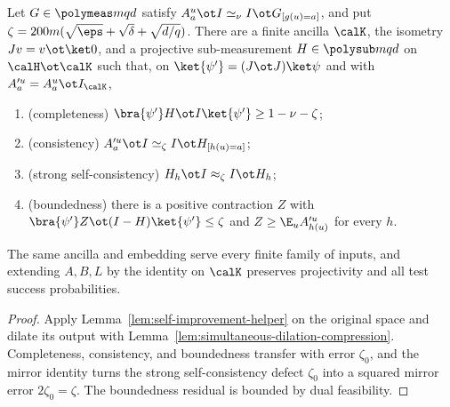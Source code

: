 \begin{theorem}\label{thm:self-improvement-in-induction-section}
	\leanok
	Let $G\in\polymeas mqd$ satisfy $A^u_a\ot I\simeq_\nu I\ot G_{[g(u)=a]}$,
	and put $\zeta=200m(\sqrt\eps+\sqrt\delta+\sqrt{d/q})$.  There are a
	finite ancilla $\calK$, the isometry $Jv=v\ot\ket0$, and a projective
	sub-measurement $H\in\polysub mqd$ on $\calH\ot\calK$ such that, on
	$\ket{\psi'}=(J\ot J)\ket\psi$ and with $A'^u_a=A^u_a\ot I_\calK$,
	\begin{enumerate}
		\item (completeness) $\bra{\psi'}H\ot I\ket{\psi'}\ge1-\nu-\zeta$;
		\item (consistency) $A'^u_a\ot I\simeq_\zeta I\ot H_{[h(u)=a]}$;
		\item (strong self-consistency) $H_h\ot I\approx_\zeta I\ot H_h$;
		\item (boundedness) there is a positive contraction $Z$ with
		      $\bra{\psi'}Z\ot(I-H)\ket{\psi'}\le\zeta$ and
		      $Z\ge\E_uA'^u_{h(u)}$ for every $h$.
	\end{enumerate}
	The same ancilla and embedding serve every finite family of inputs, and
	extending $A,B,L$ by the identity on $\calK$ preserves projectivity and all
	test success probabilities.
\end{theorem}
\begin{proof}
	\leanok
	Apply Lemma~\ref{lem:self-improvement-helper} on the original space and
	dilate its output with Lemma~\ref{lem:simultaneous-dilation-compression}.
	Completeness, consistency, and boundedness transfer with error $\zeta_0$,
	and the mirror identity turns the strong self-consistency defect
	$\zeta_0$ into a squared mirror error $2\zeta_0=\zeta$.  The boundedness
	residual is bounded by dual feasibility.
\end{proof}
